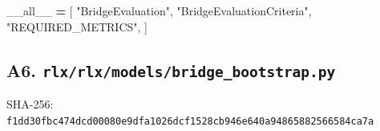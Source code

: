 \documentclass[
  chinese,
  11pt,
  letterpaper,
]{article}
\newenvironment{Shaded}{\begin{snugshade}}{\end{snugshade}}
\newcommand{\NormalTok}[1]{#1}
\newcommand{\OperatorTok}[1]{\textcolor[rgb]{0.81,0.36,0.00}{\textbf{#1}}}
\newcommand{\StringTok}[1]{\textcolor[rgb]{0.31,0.60,0.02}{#1}}
\newcommand{\VariableTok}[1]{\textcolor[rgb]{0.00,0.00,0.00}{#1}}
\renewenvironment{Shaded}{\par\smallskip}{\par\smallskip}
\begin{document}
\begin{Shaded}
\begin{Highlighting}[]
\VariableTok{\_\_all\_\_} \OperatorTok{=}\NormalTok{ [}
    \StringTok{"BridgeEvaluation"}\NormalTok{,}
    \StringTok{"BridgeEvaluationCriteria"}\NormalTok{,}
    \StringTok{"REQUIRED\_METRICS"}\NormalTok{,}
\NormalTok{]}
\end{Highlighting}
\end{Shaded}

\subsection{\texorpdfstring{A6.
\texttt{rlx/\allowbreak{}rlx/\allowbreak{}models/\allowbreak{}bridge\_\allowbreak{}bootstra\allowbreak{}p.py}}{A6. }}\label{a6.-rlxrlxmodelsbridge_bootstrap.py}

SHA-256:
\texttt{f1dd30fb\allowbreak{}c474dcd0\allowbreak{}0080e9df\allowbreak{}a1026dcf\allowbreak{}1528cb94\allowbreak{}6e640a94\allowbreak{}86588256\allowbreak{}6584ca7a\allowbreak{}}
\end{document}
